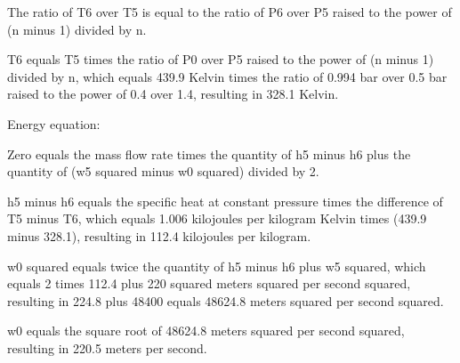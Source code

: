 The ratio of T6 over T5 is equal to the ratio of P6 over P5 raised to the power of (n minus 1) divided by n.

T6 equals T5 times the ratio of P0 over P5 raised to the power of (n minus 1) divided by n, which equals 439.9 Kelvin times the ratio of 0.994 bar over 0.5 bar raised to the power of 0.4 over 1.4, resulting in 328.1 Kelvin.

Energy equation:

Zero equals the mass flow rate times the quantity of h5 minus h6 plus the quantity of (w5 squared minus w0 squared) divided by 2.

h5 minus h6 equals the specific heat at constant pressure times the difference of T5 minus T6, which equals 1.006 kilojoules per kilogram Kelvin times (439.9 minus 328.1), resulting in 112.4 kilojoules per kilogram.

w0 squared equals twice the quantity of h5 minus h6 plus w5 squared, which equals 2 times 112.4 plus 220 squared meters squared per second squared, resulting in 224.8 plus 48400 equals 48624.8 meters squared per second squared.

w0 equals the square root of 48624.8 meters squared per second squared, resulting in 220.5 meters per second.
